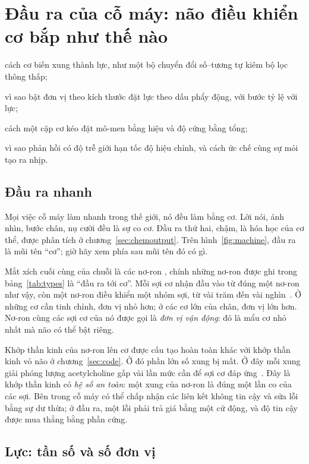 \chapter{Đầu ra của cỗ máy: não điều khiển cơ bắp như thế nào}
\label{sec:muscles}
\begin{chaptergoals}
\item cách cơ biến xung thành lực, như một bộ chuyển đổi số--tương tự kiêm bộ lọc thông thấp;
\item vì sao bật đơn vị theo kích thước đặt lực theo dấu phẩy động, với bước tỷ lệ với lực;
\item cách một cặp cơ kéo đặt mô-men bằng hiệu và độ cứng bằng tổng;
\item vì sao phản hồi có độ trễ giới hạn tốc độ hiệu chỉnh, và cách ức chế cùng sự mỏi tạo ra nhịp.
\end{chaptergoals}

\section{Đầu ra nhanh}

Mọi việc cỗ máy làm nhanh trong thế giới, nó đều làm bằng cơ. Lời nói, ánh nhìn, bước chân, nụ cười đều là sự co cơ. Đầu ra thứ hai, chậm, là hóa học của cơ thể, được phân tích ở chương~\ref{sec:chemoutput}. Trên hình~\ref{fig:machine}, đầu ra là mũi tên ``cơ''; giờ hãy xem phía sau mũi tên đó có gì.

Mắt xích cuối cùng của chuỗi là các nơ-ron , chính những nơ-ron được ghi trong bảng~\ref{tab:types} là ``đầu ra tới cơ''. Mỗi sợi cơ nhận đầu vào từ đúng một nơ-ron như vậy, còn một nơ-ron điều khiển một nhóm sợi, từ vài trăm đến vài nghìn~\cite{Feinstein1955mu}. Ở những cơ cần tinh chỉnh, đơn vị nhỏ hơn; ở các cơ lớn của chân, đơn vị lớn hơn. Nơ-ron cùng các sợi cơ của nó được gọi là \emph{đơn vị vận động}: đó là mẩu cơ nhỏ nhất mà não có thể bật riêng.

Khớp thần kinh của nơ-ron lên cơ được cấu tạo hoàn toàn khác với khớp thần kinh vỏ não ở chương~\ref{sec:code}. Ở đó phần lớn số xung bị mất. Ở đây mỗi xung giải phóng lượng acetylcholine gấp vài lần mức cần để sợi cơ đáp ứng~\cite{WoodSlater2001}. Đây là khớp thần kinh có \emph{hệ số an toàn}: một xung của nơ-ron là đúng một lần co của các sợi. Bên trong cỗ máy có thể chấp nhận các liên kết không tin cậy và sửa lỗi bằng sự dư thừa; ở đầu ra, một lỗi phải trả giá bằng một cử động, và độ tin cậy được mua thẳng bằng phần cứng.

\section{Lực: tần số và số đơn vị}

